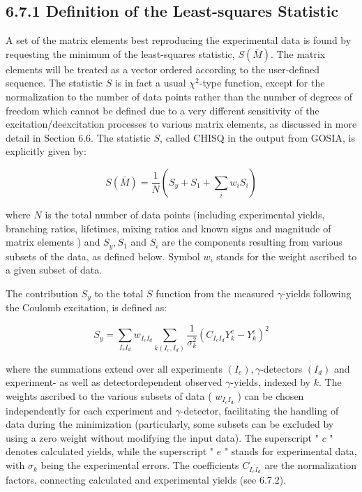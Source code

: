 \documentclass[10pt]{article}
\begin{document}
\subsection*{6.7.1 Definition of the Least-squares Statistic}
A set of the matrix elements best reproducing the experimental data is found by requesting the minimum of the least-squares statistic, $S(\bar{M})$. The matrix elements will be treated as a vector ordered according to the user-defined sequence. The statistic $S$ is in fact a usual $\chi^{2}$-type function, except for the normalization to the number of data points rather than the number of degrees of freedom which cannot be defined due to a very different sensitivity of the excitation/deexcitation processes to various matrix elements, as discussed in more detail in Section 6.6. The statistic $S$, called CHISQ in the output from GOSIA, is explicitly given by:


\begin{equation*}
S(\bar{M})=\frac{1}{N}\left(S_{y}+S_{1}+\sum_{i} w_{i} S_{i}\right) \tag{6.77}
\end{equation*}


where $N$ is the total number of data points (including experimental yields, branching ratios, lifetimes, mixing ratios and known signs and magnitude of matrix elements ) and $S_{y}, S_{1}$ and $S_{i}$ are the components resulting from various subsets of the data, as defined below. Symbol $w_{i}$ stands for the weight ascribed to a given subset of data.

The contribution $S_{y}$ to the total $S$ function from the measured $\gamma$-yields following the Coulomb excitation, is defined as:


\begin{equation*}
S_{y}=\sum_{I_{e} I_{d}} w_{I_{e} I_{d}} \sum_{k\left(I_{e}, I_{d}\right)} \frac{1}{\sigma_{k}^{2}}\left(C_{I_{e} I_{d}} Y_{k}^{c}-Y_{k}^{e}\right)^{2} \tag{6.78}
\end{equation*}


where the summations extend over all experiments $\left(I_{e}\right), \gamma$-detectors $\left(I_{d}\right)$ and experiment- as well as detectordependent observed $\gamma$-yields, indexed by $k$. The weights ascribed to the various subsets of data ( $w_{I_{e} I_{d}}$ ) can be chosen independently for each experiment and $\gamma$-detector, facilitating the handling of data during the minimization (particularly, some subsets can be excluded by using a zero weight without modifying the input data). The superscript " $c$ " denotes calculated yields, while the superscript " $e$ " stands for experimental data, with $\sigma_{k}$ being the experimental errors. The coefficients $C_{I_{e} I_{d}}$ are the normalization factors, connecting calculated and experimental yields (see 6.7.2).
\end{document}
